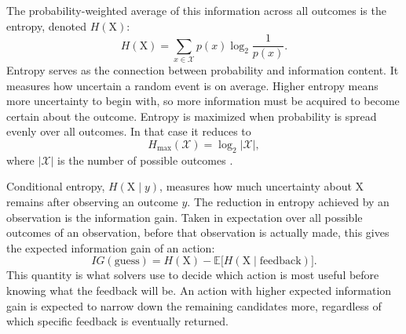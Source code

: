The probability-weighted average of this information across all outcomes is the entropy, denoted $H(\mathrm{X})$:
\begin{equation}
H(\mathrm{X}) = \sum_{x \in \mathcal{X}} p(x) \log_2 \frac{1}{p(x)}.
\label{eq:entropy}
\end{equation}
Entropy serves as the connection between probability and information content. It measures how uncertain a random event is on average. Higher entropy means more uncertainty to begin with, so more information must be acquired to become certain about the outcome. Entropy is maximized when probability is spread evenly over all outcomes. In that case it reduces to
\begin{equation}
H_{\text{max}}(\mathcal{X}) = \log_2 |\mathcal{X}|,
\label{eq:maxentropy}
\end{equation}
where $|\mathcal{X}|$ is the number of possible outcomes \cite{pinkardVisualIntroductionInformation2026}.

Conditional entropy, $H(\mathrm{X} \mid y)$, measures how much uncertainty about $\mathrm{X}$ remains after observing an outcome $y$. The reduction in entropy achieved by an observation is the information gain. Taken in expectation over all possible outcomes of an observation, before that observation is actually made, this gives the expected information gain of an action:
\begin{equation}
IG(\text{guess}) = H(\mathrm{X}) - \mathbb{E}\big[H(\mathrm{X} \mid \text{feedback})\big].
\label{eq:infogain}
\end{equation}
This quantity is what solvers use to decide which action is most useful before knowing what the feedback will be. An action with higher expected information gain is expected to narrow down the remaining candidates more, regardless of which specific feedback is eventually returned.

